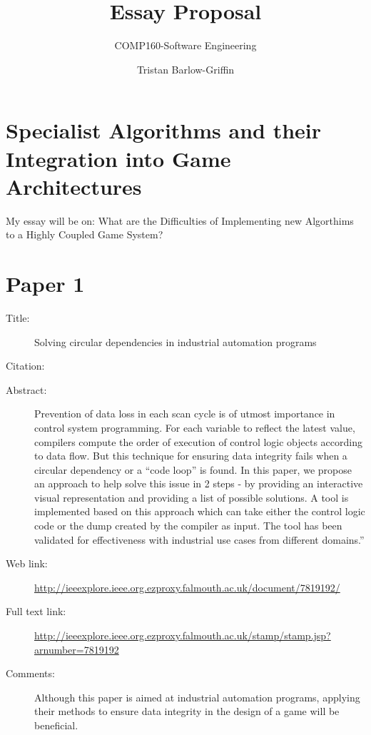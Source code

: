 \documentclass{scrartcl}
\title{Essay Proposal}
\subtitle{COMP160-Software Engineering}
\author{Tristan Barlow-Griffin}
\begin{document}
\maketitle

\section*{Specialist Algorithms and their Integration into Game Architectures}

My essay will be on: What are the Difficulties of Implementing new Algorthims to a Highly Coupled Game System?




\section*{Paper 1}
\begin{description}
\item[Title:] Solving circular dependencies in industrial automation programs
\item[Citation:] \cite{nair2016solving}
\item[Abstract:] Prevention of data loss in each scan cycle is of utmost importance in control system programming. For each variable to reflect the latest value, compilers compute the order of execution of control logic objects according to data flow. But this technique for ensuring data integrity fails when a circular dependency or a “code loop” is found. In this paper, we propose an approach to help solve this issue in 2 steps - by providing an interactive visual representation and providing a list of possible solutions. A tool is implemented based on this approach which can take either the control logic code or the dump created by the compiler as input. The tool has been validated for effectiveness with industrial use cases from different domains.''
\item[Web link:] \url{http://ieeexplore.ieee.org.ezproxy.falmouth.ac.uk/document/7819192/}
\item[Full text link:] \url{http://ieeexplore.ieee.org.ezproxy.falmouth.ac.uk/stamp/stamp.jsp?arnumber=7819192}
\item[Comments:] Although this paper is aimed at industrial automation programs, applying their methods to ensure data integrity in the design of a game will be beneficial.
\end{description}
\end{document}
